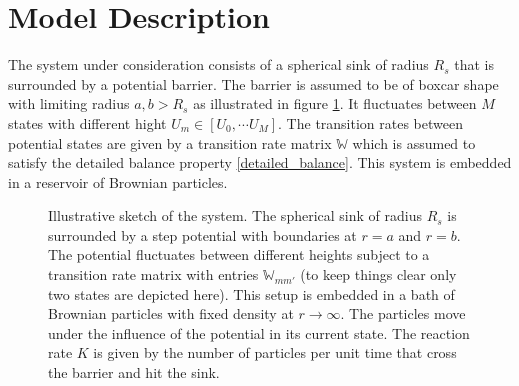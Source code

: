 \section{Model Description}
\label{Model_Description}
The system under consideration consists of a spherical sink of radius $R_s$ that is surrounded by a potential barrier. The barrier is assumed to be of boxcar shape with limiting radius $a,b>R_s$ as illustrated in figure \ref{skizze}. It fluctuates between $M$ states with different hight $U_m \in [U_0, \cdots U_M]$. The transition rates between potential states are given by a transition rate matrix $\mathbb{W}$ which is assumed to satisfy the detailed balance property \eqref{detailed_balance}. This system is embedded in a reservoir of Brownian particles. \\
\hspace{-2 cm}\begin{minipage}[t]{.5 \textwidth}
    \begin{figure}[H]
 \hspace{-1.8 cm}       
    \end{figure}
\end{minipage}\hspace{0.05 \textwidth}\begin{minipage}[t]{.45\textwidth}
    \begin{figure}[H]
        \caption{Illustrative sketch of the system. The spherical sink of radius $R_s$ is surrounded by a step potential with boundaries at $r=a$ and $r=b$. The potential fluctuates between different heights subject to a transition rate matrix with entries $\mathbb{W}_{mm'}$ (to keep things clear only two states are depicted here). This setup is embedded in a bath of Brownian particles with fixed density at $r \rightarrow \infty$. The particles move under the influence of the potential in its current state. The reaction rate $K$ is given by the number of particles per unit time that cross the barrier and hit the sink.\label{skizze}}
    \end{figure}
\end{minipage}

